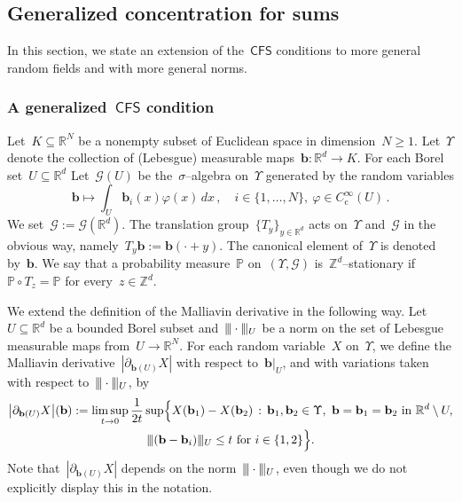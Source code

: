 \documentclass[11pt,twoside]{article} %
\numberwithin{equation}{section}
\theoremstyle{definition}
\let\originalleft\left
\let\originalright\right
\renewcommand{\left}{\mathopen{}\mathclose\bgroup\originalleft}
\renewcommand{\right}{\aftergroup\egroup\originalright}
\newcommand{\vertiii}{\vert\kern-0.3ex\vert\kern-0.25ex\vert}
\newcommand*{\R}{\ensuremath{\mathbb{R}}}
\newcommand*{\Zd}{\ensuremath{\mathbb{Z}^d}}
\newcommand*{\Rd}{\ensuremath{\mathbb{R}^d}}
\renewcommand{\b}{\ensuremath{\mathbf{b}}}
\renewcommand{\P}{\mathbb{P}}
\newcommand{\CFS}{\mathsf{CFS}}
\begin{document}
\subsection{Generalized concentration for sums}
\label{s.closure}

In this section, we state an extension of the~$\CFS$ conditions to more general random fields and with more general norms.

\smallskip

\subsubsection{A generalized~$\CFS$ condition}
\label{ss.CFS.gen}

Let~$K \subseteq \R^{N}$ be a nonempty subset of Euclidean space in dimension~$N\geq 1$. Let~$\Upsilon$ denote the collection of (Lebesgue) measurable maps~$\b:\Rd \to K$. For each Borel set~$U\subseteq \Rd$ Let~$\mathcal{G}(U)$ be the~$\sigma$--algebra on~$\Upsilon$ generated by the random variables \begin{equation*}
\b \mapsto \int_{U} \b_i(x) \varphi (x) \,dx \,, \quad i \in \{1,\ldots,N\}, \ \varphi\in C^\infty_{\mathrm{c}}(U)\,.
\end{equation*}
We set~$\mathcal{G}:=\mathcal{G}(\Rd)$.
The translation group~$\{ T_y \}_{y\in\Rd}$ acts on~$\Upsilon$ and~$\mathcal{G}$ in the obvious way, namely~$T_y\b := \b(\cdot+y)$. 
The canonical element of~$\Upsilon$ is denoted by~$\b$. 
We say that a probability measure~$\P$ on~$(\Upsilon,\mathcal{G})$ is~$\Zd$--stationary if~$\P\circ T_z = \P$ for every~$z\in\Zd$. 

\smallskip

We extend the definition of the Malliavin derivative in the following way. 
Let~$U\subseteq\Rd$ be a bounded Borel subset and~$\vertiii \cdot \vertiii_U$ be a norm on the set of Lebesgue measurable maps from~$U \to \R^N$. 
For each random variable~$X$ on~$\Upsilon$, we define the Malliavin derivative~$|\partial_{\b(U)} X|$ with respect to~$\b\vert_U$, and with variations taken with respect to~$\vertiii \cdot \vertiii_U$, by
\begin{multline} 
\label{e.Mall.Maul.yes}
\left| \partial_{\b(U)} X\right| (\b) 
:=
\limsup_{t\to 0} 
\frac1{2t} 
\sup
\Bigl\{ X(\b_1) - X(\b_2) 
\,:\,
\b_1,\b_2 \in\Upsilon, \ \b = \b_1 = \b_2 \ \mbox{in} \ \Rd\setminus U, 
\\
\vertiii (\b - \b_i) \vertiii_U \leq t  \ \mbox{for} \ i\in\{1,2\}
\Bigr\}.
\end{multline}
Note that~$|\partial_{\b(U)} X|$ depends on the norm~$\vertiii \cdot \vertiii_U$, even though we do not explicitly display this in the notation. 
\end{document}
